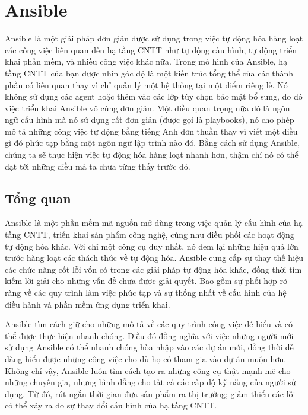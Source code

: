\section{Ansible}
Ansible là một giải pháp đơn giản được sử dụng trong việc tự động hóa hàng loạt các công việc liên quan đến hạ tầng CNTT như tự động cấu hình, tự động triển khai phần mềm, và nhiều công việc khác nữa. Trong mô hình của Ansible, hạ tầng CNTT của bạn được nhìn góc độ là một kiến trúc tổng thể của các thành phần có liên quan thay vì chỉ quản lý một hệ thống tại một điểm riêng lẻ. Nó không sử dụng các agent hoặc thêm vào các lớp tùy chọn bảo mật bổ sung, do đó việc triển khai Ansible vô cùng đơn giản. Một điều quan trọng nữa đó là ngôn ngữ cấu hình mà nó sử dụng rất đơn giản (được gọi là playbooks), nó cho phép mô tả những công việc tự động bằng tiếng Anh đơn thuần thay vì viết một điều gì đó phức tạp bằng một ngôn ngữ lập trình nào đó. Bằng cách sử dụng Ansible, chúng ta sẽ thực hiện việc tự động hóa hàng loạt nhanh hơn, thậm chí nó có thể đạt tới những điều mà ta chưa từng thấy trước đó.

\subsection{Tổng quan}

Ansible là một phần mềm mã nguồn mở dùng trong việc quản lý cấu hình của hạ tầng CNTT, triển khai sản phẩm công nghệ, cùng như điều phối các hoạt động tự động hóa khác. Với chỉ một công cụ duy nhất, nó đem lại những hiệu quả lớn trước hàng loạt các thách thức về tự động hóa. Ansible cung cấp sự thay thế hiệu các chức năng cốt lỗi vốn có trong các giải pháp tự động hóa khác, đồng thời tìm kiếm lời giải cho những vấn đề chưa được giải quyết. Bao gồm sự phối hợp rõ ràng về các quy trình làm việc phức tạp và sự thống nhất về cấu hình của hệ điều hành và phần mềm ứng dụng triển khai.

Ansible tìm cách giữ cho những mô tả về các quy trình công việc dễ hiểu và có thể được thực hiện nhanh chóng. Điều đó đồng nghĩa với việc những người mới sử dụng Ansible có thể nhanh chóng hòa nhập vào các dự án mới, đồng thời dễ dàng hiểu được những công việc cho dù họ có tham gia vào dự án muộn hơn. Không chỉ vậy, Ansible luôn tìm cách tạo ra những công cụ thật mạnh mẽ cho những chuyên gia, nhưng bình đẳng cho tất cả các cấp độ kỹ năng của người sử dụng. Từ đó, rút ngắn thời gian đưa sản phẩm ra thị trường; giảm thiểu các lỗi có thể xảy ra do sự thay đổi cấu hình của hạ tầng CNTT.

